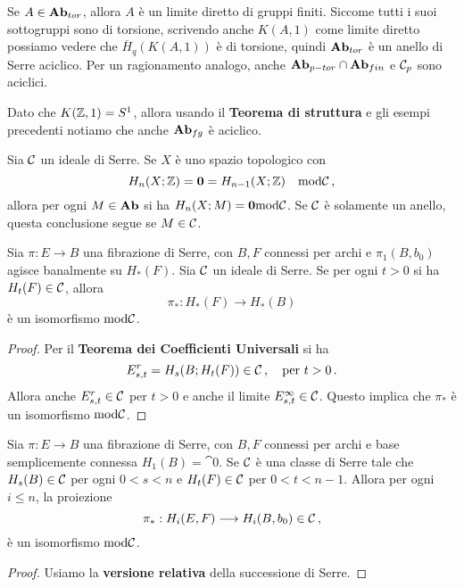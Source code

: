 \begin{ex}
	Se $A \in {\normalfont\textbf{Ab}}_{tor}$, allora $A$ è un limite diretto di gruppi finiti.
	Siccome tutti i suoi sottogruppi sono di torsione,
	scrivendo anche $K(A,1)$ come limite diretto
	possiamo vedere che $\overline{H}_{q}(K(A,1))$ è di torsione,
	quindi ${\normalfont\textbf{Ab}}_{tor}$ è un anello di Serre aciclico.
	Per un ragionamento analogo, 
	anche ${\normalfont\textbf{Ab}}_{p-tor} \cap {\normalfont\textbf{Ab}}_{fin}$ e $\mathcal{C}_{p}$ sono aciclici.
\end{ex}

\begin{ex}
	Dato che $K({\mathbb Z},1) = S^{1}$, allora usando il \textbf{Teorema di struttura}
	e gli esempi precedenti notiamo che anche ${\normalfont\textbf{Ab}}_{fg}$ è aciclico.
\end{ex}

\begin{rmk}
	Sia $\mathcal{C}$ un ideale di Serre. Se $X$ è uno spazio topologico con
	\begin{equation*}
		H_{n}(X; {\mathbb Z}) = {\normalfont\textbf{0}} = H_{n-1}(X;{\mathbb Z}) \quad \mathrm{mod}\mathcal{C}\,,
	\end{equation*}
	allora per ogni $M \in {\normalfont\textbf{Ab}}$ si ha $H_{n}(X;M) = {\normalfont\textbf{0}} \mathrm{mod} \mathcal{C}$.
	Se $\mathcal{C}$ è solamente un anello, questa conclusione segue
	se $M \in \mathcal{C}$. 
\end{rmk}

\begin{prop}
	Sia $\pi : E \to B$ una fibrazione di Serre, con $B,F$ connessi per archi
	e $\pi_{1}(B, b_{0})$ agisce banalmente su $H_{*}(F)$.
	Sia $\mathcal{C}$ un ideale di Serre.
	Se per ogni $t > 0$ si ha $H_{t}(F) \in \mathcal{C}$, allora
	\begin{equation*}
		\pi_{*}:H_{*}(F) \longrightarrow H_{*}(B)
	\end{equation*}
	è un isomorfismo $\mathrm{mod}\mathcal{C}$.
	\begin{proof}
		Per il \textbf{Teorema dei Coefficienti Universali} si ha
		\begin{equation*}
			E^{r}_{s,t} = H_{s}(B;H_{t}(F)) \in \mathcal{C}\,, \quad \text{per } t>0\,.
		\end{equation*}
		Allora anche $E^{r}_{s,t} \in \mathcal{C}$ per $t >0$ e anche il
		limite $E^{\infty}_{s,t} \in \mathcal{C}$. Questo implica che $\pi_{*}$
		è un isomorfismo $\mathrm{mod}\mathcal{C}$.
	\end{proof}
\end{prop}

\begin{prop}\label{serre-mod-c}
	Sia $\pi : E \to B$ una fibrazione di Serre,
	con $B,F$ connessi per archi e base semplicemente connessa $H_{1}(B)=\cat{0}$.
	Se $\mathcal{C}$ è una classe di Serre tale che $H_{s}(B) \in \mathcal{C}$ per ogni $0 < s < n$
	e $H_{t}(F) \in \mathcal{C}$ per $ 0 < t < n-1$. Allora per ogni $i \le n$,
	la proiezione
	\begin{equation*}
			\pi_{*}:H_{i}(E,F) \longrightarrow 
			H_{i}(B,b_{0}) \in \mathcal{C}\,, 
		\end{equation*}
		è un isomorfismo $\mathrm{mod}\mathcal{C}$.
		\begin{proof}
			Usiamo la \textbf{versione relativa}  della successione di Serre.
		\end{proof}
\end{prop}

